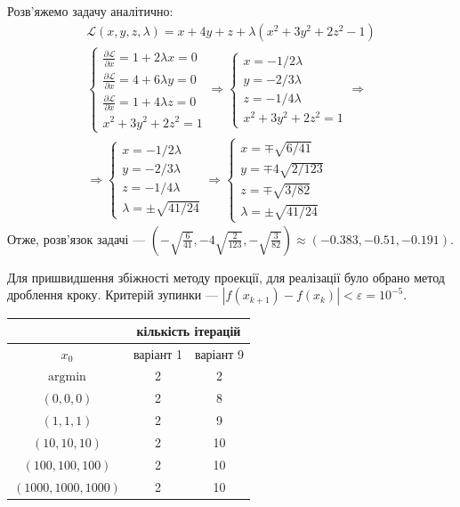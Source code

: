 \documentclass{extreport}
\begin{document}
Розв'яжемо задачу аналітично:
\begin{gather*}
    \mathcal{L}(x, y, z, \lambda) = x + 4y + z + \lambda(x^2 + 3y^2 + 2z^2 - 1) \\
    \begin{cases}
        \frac{\partial \mathcal{L}}{\partial x} = 1 + 2\lambda x = 0 \\
        \frac{\partial \mathcal{L}}{\partial x} = 4 + 6\lambda y = 0 \\
        \frac{\partial \mathcal{L}}{\partial x} = 1 + 4\lambda z = 0 \\
        x^2 + 3y^2 + 2z^2 = 1
    \end{cases} \Rightarrow
    \begin{cases}
        x = -1/{2\lambda} \\
        y = -2/{3\lambda} \\
        z = -1/{4\lambda} \\
        x^2 + 3y^2 + 2z^2 = 1
    \end{cases} \Rightarrow \\ \Rightarrow
    \begin{cases}
        x = -1/{2\lambda} \\
        y = -2/{3\lambda} \\
        z = -1/{4\lambda} \\
        \lambda = \pm \sqrt{41/24}
    \end{cases} \Rightarrow
    \begin{cases}
        x = \mp \sqrt{6/41} \\
        y = \mp 4\sqrt{2/123} \\
        z = \mp \sqrt{3/82} \\
        \lambda = \pm \sqrt{41/24}
    \end{cases}
\end{gather*}
Отже, розв'язок задачі --- $\left(-\sqrt{\frac{6}{41}}, -4\sqrt{\frac{2}{123}}, -\sqrt{\frac{3}{82}}\right) \approx \left(-0.383, -0.51, -0.191\right)$.

Для пришвидшення збіжності методу проекції, для реалізації було обрано метод дроблення кроку.
Критерій зупинки --- $\left| f(x_{k+1}) - f(x_k)\right| < \varepsilon = 10^{-5}$.

\begin{center}
    \begin{tabular}{|c|c|c|}
        \hline
        {} & \multicolumn{2}{c|}{кількість ітерацій}\\
        \hline
        $x_0$ & {варіант 1} & {варіант 9}\\
        \hline
        $\mathrm{argmin}$ & 2 & 2 \\
        \hline
        $(0, 0, 0)$ & 2 & 8 \\
        \hline
        $(1, 1, 1)$ & 2 & 9 \\
        \hline
        $(10, 10, 10)$ & 2 & 10 \\
        \hline
        $(100, 100, 100)$ & 2 & 10 \\
        \hline
        $(1000, 1000, 1000)$ & 2 & 10 \\
        \hline
    \end{tabular}
\end{center}
\end{document}
